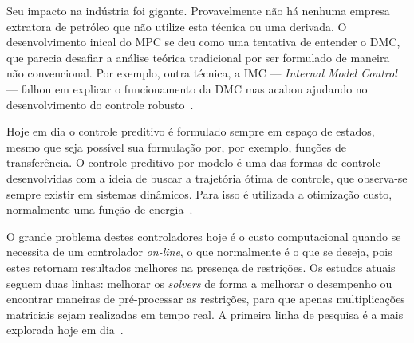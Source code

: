 Seu impacto na indústria foi gigante. Provavelmente não há nenhuma empresa
extratora de petróleo que não utilize esta técnica ou uma derivada. O
desenvolvimento inical do \ac{MPC} se deu como uma tentativa de entender o
\ac{DMC}, que parecia desafiar a análise teórica tradicional por ser formulado
de maneira não convencional. Por exemplo, outra técnica, a \ac{IMC} ---
\textit{Internal Model Control} --- falhou em explicar o funcionamento da DMC
mas acabou ajudando no desenvolvimento do controle
robusto~\cite{article:morari}.

Hoje em dia o controle preditivo é formulado sempre em espaço de estados, mesmo
que seja possível sua formulação por, por exemplo, funções de transferência.
O controle preditivo por modelo é uma das formas de controle desenvolvidas com
a ideia de buscar a trajetória ótima de controle, que observa-se sempre existir
em sistemas dinâmicos. Para isso é utilizada a otimização custo, normalmente uma
função de energia~\cite{article:morari,book:bryson}.

O grande problema destes controladores hoje é o custo computacional quando se
necessita de um controlador \textit{on-line}, o que normalmente é o que se
deseja, pois estes retornam resultados melhores na presença de restrições. Os
estudos atuais seguem duas linhas: melhorar os \textit{solvers} de forma a
melhorar o desempenho ou encontrar maneiras de pré-processar as restrições, para
que apenas multiplicações matriciais sejam realizadas em tempo real. A primeira
linha de pesquisa é a mais explorada hoje em
dia~\cite{book:wang,masterthesis:zhang}.
